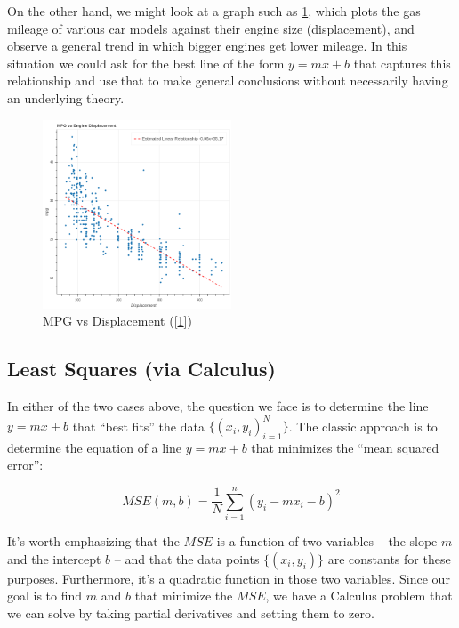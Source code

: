 \documentclass[]{article}
\begin{document}
On the other hand, we might look at a graph such as
\cref{fig:mpg-vs-displacement}, which plots the gas mileage of various
car models against their engine size (displacement), and observe a
general trend in which bigger engines get lower mileage. In this
situation we could ask for the best line of the form \(y=mx+b\) that
captures this relationship and use that to make general conclusions
without necessarily having an underlying theory.

\begin{figure}
\hypertarget{fig:mpg-vs-displacement}{%
\centering
\includegraphics[width=0.5\textwidth,height=\textheight]{../img/mpg-vs-displacement.png}
\caption{MPG vs Displacement
({[}\protect\hyperlink{ref-irvine}{1}{]})}\label{fig:mpg-vs-displacement}
}
\end{figure}

\hypertarget{sec:Calculus}{%
\subsection{Least Squares (via Calculus)}\label{sec:Calculus}}

In either of the two cases above, the question we face is to determine
the line \(y=mx+b\) that ``best fits'' the data
\(\{(x_i,y_i)_{i=1}^{N}\}\). The classic approach is to determine the
equation of a line \(y=mx+b\) that minimizes the ``mean squared error'':

\[
MSE(m,b) = \frac{1}{N}\sum_{i=1}^{n} (y_i-mx_i-b)^2
\]

It's worth emphasizing that the \(MSE\) is a function of two variables
-- the slope \(m\) and the intercept \(b\) -- and that the data points
\(\{(x_i,y_i)\}\) are constants for these purposes. Furthermore, it's a
quadratic function in those two variables. Since our goal is to find
\(m\) and \(b\) that minimize the \(MSE\), we have a Calculus problem
that we can solve by taking partial derivatives and setting them to
zero.
\end{document}
